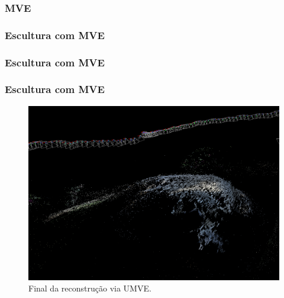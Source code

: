 \documentclass[table, usenames, svgnames, xcolor=dvipsnames]{beamer}
\begin{document}
\subsubsection{MVE}

\begin{frame}
\frametitle{\textbf{Escultura com MVE}}
	\begin{center}
	\end{center}
\end{frame}

\begin{frame}
\frametitle{\textbf{Escultura com MVE}}
	\begin{center}
	\end{center}
\end{frame}

\begin{frame}
	\frametitle{\textbf{Escultura com MVE}}
		\begin{figure}[!h]
		\centering
		\includegraphics[width=0.9\linewidth]{figs/umvedense.png}
		\caption{%
		Final da reconstrução via UMVE.
		}\label{fig:UMVEdense}
	\end{figure} 
\end{frame}
\end{document}

